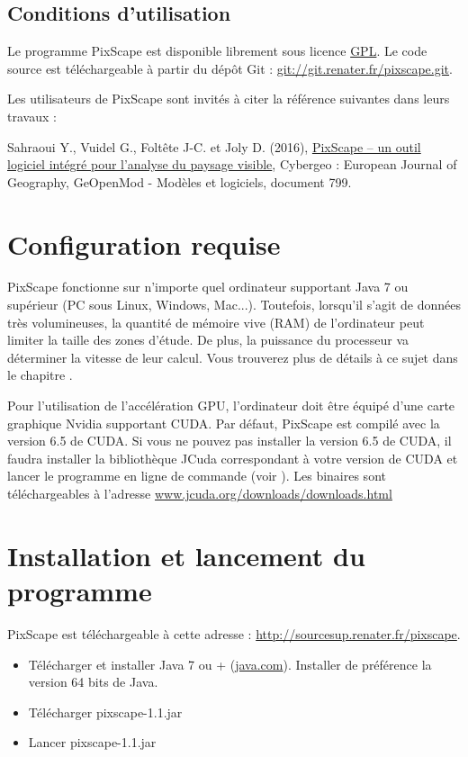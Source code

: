 \documentclass{report}
\begin{document}
\subsection{Conditions d’utilisation}
Le programme PixScape est disponible librement sous licence \href{https://www.gnu.org/licenses/gpl-3.0.fr.html}{GPL}. Le code source est téléchargeable à partir du dépôt Git : \url{git://git.renater.fr/pixscape.git}.

Les utilisateurs de PixScape sont invités à citer la référence  suivantes  dans leurs travaux :

Sahraoui Y., Vuidel G., Foltête J-C. et Joly D. (2016), \href{http://cybergeo.revues.org/27862}{PixScape – un outil logiciel intégré pour l’analyse du paysage visible}, Cybergeo : European Journal of Geography, GeOpenMod - Modèles et logiciels, document 799. 


\section{Configuration requise}

PixScape fonctionne sur n'importe quel ordinateur supportant Java 7 ou supérieur (PC sous Linux, Windows, Mac...). Toutefois, lorsqu'il s'agit de données très volumineuses, la quantité de mémoire vive (RAM) de l’ordinateur peut limiter la taille des zones d'étude. De plus, la puissance du processeur va déterminer la vitesse de leur calcul. Vous trouverez plus de détails à ce sujet dans le chapitre . 

Pour l'utilisation de l'accélération GPU, l'ordinateur doit être équipé d'une carte graphique Nvidia supportant CUDA. Par défaut, PixScape est compilé avec la version 6.5 de CUDA. Si vous ne pouvez pas installer la version 6.5 de CUDA, il faudra installer la bibliothèque JCuda correspondant à votre version de CUDA et lancer le programme en ligne de commande (voir ). Les binaires sont téléchargeables à l'adresse \href{http://www.jcuda.org/downloads/downloads.html}{www.jcuda.org/downloads/downloads.html}

\section{Installation et lancement du programme}

PixScape est téléchargeable à cette adresse : \url{http://sourcesup.renater.fr/pixscape}.

\begin{itemize}
	\item Télécharger et installer Java 7 ou + (\href{http://www.java.com}{java.com}). Installer de préférence la version 64 bits de Java.
	\item Télécharger pixscape-1.1.jar
	\item Lancer pixscape-1.1.jar
\end{itemize}
\end{document}

